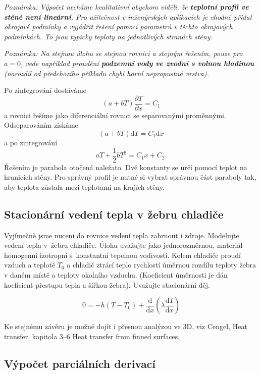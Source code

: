 \textit{Poznámka: Výpočet necháme kvalitativní abychom viděli, že {\bfseries teplotní profil ve stěně není lineární}. Pro užitečnost v inženýrských aplikacích je vhodné přidat okrajové podmínky a vyjádřit řešení pomocí parametrů v těchto okrajových podmínkách. To jsou typicky teploty na jednotlivých stranách stěny.}

\textit{Poznámka: Na stejnou úlohu se stejnou rovnicí a stejným řešením, pouze pro $a=0$, vede například proudění {\bfseries podzemní vody ve zvodni s volnou hladinou} (narozdíl od předchozího příkladu chybí horní nepropustná vrstva).}

\reseni
Po zintegrování dostáváme
$$(a+bT)\frac{\partial T}{\partial x}=C_1$$
a rovnici řešíme jako diferenciální rovnici se separovanými proměnnými.
Odseparováním získáme
$$(a+bT)\mathrm dT=C_1\mathrm dx$$
a po zintegrování
$$aT+\frac 12bT^2 = C_1x+C_2.$$
Řešením je
parabola otočená naležato. Dvě konstanty se určí pomocí teplot na hranicích stěny. Pro správný profil je nutné si vybrat
správnou část paraboly tak, aby teplota zůstala mezi teplotami na
krajích stěny.
\konec

\stranka

\subsection{Stacionární vedení tepla v žebru chladiče}

Vyjímečně jsme nuceni do rovnice vedení tepla zahrnout i zdroje. 
Modelujte vedení tepla v~žebru chladiče. Úlohu uvažujte jako
jednorozměrnou, materiál homogenní izotropní s~konstantní tepelnou
vodivostí. Kolem chladiče proudí vzduch a teplotě $T_0$ a chladič
ztrácí teplo rychlostí úměrnou rozdílu teploty žebra v daném místě a
teploty okolního vzduchu. (Koeficient úměrnosti je dán koeficient přestupu tepla a šířkou žebra). Uvažujte stacionární děj.

\reseni

$$0=-h(T-T_0)+\frac{\mathrm d}{\mathrm dx}\left(\lambda \frac{\mathrm dT}{\mathrm dx}\right)$$


Ke stejnému závěru je možné dojít i přesnou analýzou ve 3D, viz Cengel, Heat transfer, kapitola 3–6 Heat transfer from finned surfaces.

\konec

\subsection{Výpočet  parciálních derivací}

